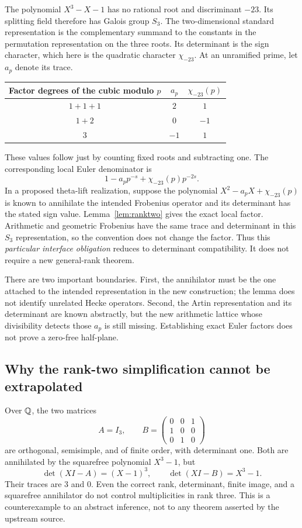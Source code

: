 The polynomial \(X^3-X-1\) has no rational root and discriminant
\(-23\). Its splitting field therefore has Galois group \(S_3\).
The two-dimensional standard representation is the complementary
summand to the constants in the permutation representation on the three
roots. Its determinant is the sign character, which here is the
quadratic character \(\chi_{-23}\).
At an unramified prime, let \(a_p\) denote its trace.

\begin{center}
\begin{tabular}{ccc}
\toprule
Factor degrees of the cubic modulo \(p\) & \(a_p\) & \(\chi_{-23}(p)\)\\
\midrule
\(1+1+1\) & \(2\) & \(1\)\\
\(1+2\) & \(0\) & \(-1\)\\
\(3\) & \(-1\) & \(1\)\\
\bottomrule
\end{tabular}
\end{center}

These values follow just by counting fixed roots and subtracting one.
The corresponding local Euler denominator is
\[
 1-a_p p^{-s}+\chi_{-23}(p)p^{-2s}.
\]
In a proposed theta-lift realization, suppose the polynomial
\(X^2-a_pX+\chi_{-23}(p)\) is known to annihilate the intended
Frobenius operator and its determinant has the stated sign value.
Lemma~\ref{lem:ranktwo} gives the exact local factor.
Arithmetic and geometric Frobenius have the same trace and determinant
in this \(S_3\) representation, so the convention does not change the factor.
Thus this \emph{particular interface obligation} reduces to determinant
compatibility. It does not require a new general-rank theorem.

There are two important boundaries. First, the annihilator must be the
one attached to the intended representation in the new construction;
the lemma does not identify unrelated Hecke operators. Second, the
Artin representation and its determinant are known abstractly, but the
new arithmetic lattice whose divisibility detects those \(a_p\) is still
missing. Establishing exact Euler factors does not prove a zero-free
half-plane.

\subsection{Why the rank-two simplification cannot be extrapolated}

Over \(\mathbb Q\), the two matrices
\[
 A=I_3,\qquad
 B=\begin{pmatrix}0&0&1\\1&0&0\\0&1&0\end{pmatrix}
\]
are orthogonal, semisimple, and of finite order, with determinant one.
Both are annihilated by the squarefree polynomial \(X^3-1\), but
\[
 \det(XI-A)=(X-1)^3,\qquad
 \det(XI-B)=X^3-1.
\]
Their traces are \(3\) and \(0\). Even the correct rank, determinant,
finite image, and a squarefree annihilator do not control multiplicities
in rank three. This is a counterexample to an abstract inference,
not to any theorem asserted by the upstream source.

